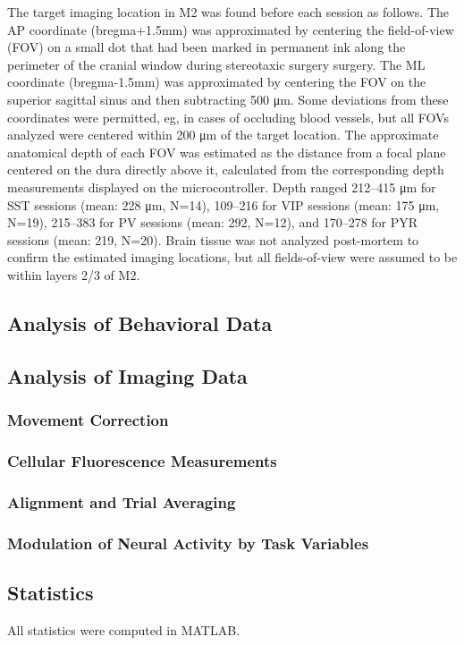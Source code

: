 The target imaging location in M2 was found before each session as follows. The AP coordinate (bregma+1.5mm) was approximated by centering the field-of-view (FOV) on a small dot that had been marked in permanent ink along the perimeter of the cranial window during stereotaxic surgery surgery. The ML coordinate (bregma-1.5mm) was approximated by centering the FOV on the superior sagittal sinus and then subtracting 500 \si{\um}. Some deviations from these coordinates were permitted, eg, in cases of occluding blood vessels, but all FOVs analyzed were centered within 200 \si{\um} of the target location. The approximate anatomical depth of each FOV was estimated as the distance from a focal plane centered on the dura directly above it, calculated from the corresponding depth measurements displayed on the microcontroller. Depth ranged 212--415 \si{\um} for SST sessions (mean: 228 \si{\um}, N=14), 109--216 for VIP sessions (mean: 175 \si{\um}, N=19), 215--383 for PV sessions (mean: 292, N=12), and 170--278 for PYR sessions (mean: 219, N=20). Brain tissue was not analyzed post-mortem to confirm the estimated imaging locations, but all fields-of-view were assumed to be within layers 2/3 of M2.

\subsection*{Analysis of Behavioral Data}
\subsection*{Analysis of Imaging Data}
\subsubsection*{Movement Correction}
\subsubsection*{Cellular Fluorescence Measurements}
\subsubsection*{Alignment and Trial Averaging}
\subsubsection*{Modulation of Neural Activity by Task Variables}

\subsection*{Statistics}
All statistics were computed in MATLAB.

